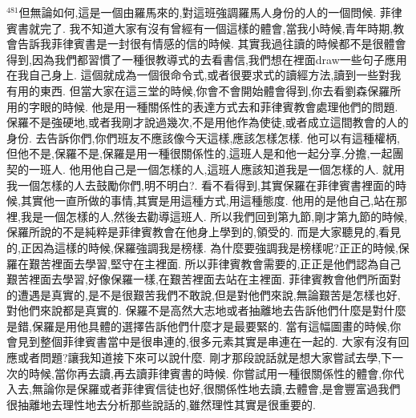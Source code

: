 \documentclass{book}
\begin{document}
$^{481}$但無論如何,這是一個由羅馬來的,對這班強調羅馬人身份的人的一個問候.
菲律賓書就完了.
我不知道大家有沒有曾經有一個這樣的體會,當我小時候,青年時期,教會告訴我菲律賓書是一封很有情感的信的時候.
其實我過往讀的時候都不是很體會得到,因為我們都習慣了一種很教導式的去看書信,我們想在裡面draw一些句子應用在我自己身上.
這個就成為一個很命令式,或者很要求式的讀經方法,讀到一些對我有用的東西.
但當大家在這三堂的時候,你會不會開始體會得到,你去看劉森保羅所用的字眼的時候.
他是用一種關係性的表達方式去和菲律賓教會處理他們的問題.
保羅不是強硬地,或者我剛才說過幾次,不是用他作為使徒,或者成立這間教會的人的身份.
去告訴你們,你們班友不應該像今天這樣,應該怎樣怎樣.
他可以有這種權柄,但他不是,保羅不是,保羅是用一種很關係性的,這班人是和他一起分享,分擔,一起團契的一班人.
他用他自己是一個怎樣的人,這班人應該知道我是一個怎樣的人.
就用我一個怎樣的人去鼓勵你們,明不明白?.
看不看得到,其實保羅在菲律賓書裡面的時候,其實他一直所做的事情,其實是用這種方式,用這種態度.
他用的是他自己,站在那裡,我是一個怎樣的人,然後去勸導這班人.
所以我們回到第九節,剛才第九節的時候,保羅所說的不是純粹是菲律賓教會在他身上學到的,領受的.
而是大家聽見的,看見的,正因為這樣的時候,保羅強調我是榜樣.
為什麼要強調我是榜樣呢?正正的時候,保羅在艱苦裡面去學習,堅守在主裡面.
所以菲律賓教會需要的,正正是他們認為自己艱苦裡面去學習,好像保羅一樣,在艱苦裡面去站在主裡面.
菲律賓教會他們所面對的遭遇是真實的,是不是很艱苦我們不敢說,但是對他們來說,無論艱苦是怎樣也好,對他們來說都是真實的.
保羅不是高然大志地或者抽離地去告訴他們什麼是對什麼是錯,保羅是用他具體的選擇告訴他們什麼才是最要緊的.
當有這幅圖畫的時候,你會見到整個菲律賓書當中是很串連的,很多元素其實是串連在一起的.
大家有沒有回應或者問題?讓我知道接下來可以說什麼.
剛才那段說話就是想大家嘗試去學,下一次的時候,當你再去讀,再去讀菲律賓書的時候.
你嘗試用一種很關係性的體會,你代入去,無論你是保羅或者菲律賓信徒也好,很關係性地去讀,去體會,是會豐富過我們很抽離地去理性地去分析那些說話的,雖然理性其實是很重要的.
\newpage
\end{document}
